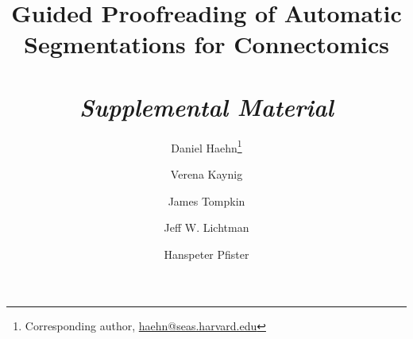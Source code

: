 \documentclass[10pt,twocolumn,letterpaper]{article}
\begin{document}
\title{Guided Proofreading of Automatic Segmentations for Connectomics\\~\\\textit{Supplemental Material}}



\author[1]{Daniel Haehn\thanks{Corresponding author,  \url{haehn@seas.harvard.edu}}}
\author[1]{Verena Kaynig}
\author[2]{James Tompkin}
\author[1]{Jeff W. Lichtman}
\author[1]{Hanspeter Pfister}

\maketitle








{\small


}
\end{document}
